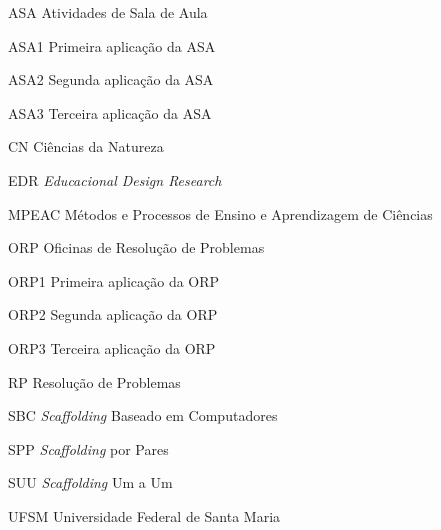 \begin{siglas}
    \item[ASA] Atividades de Sala de Aula 
    \item[ASA1] Primeira aplicação da ASA 
    \item[ASA2] Segunda aplicação da ASA 
    \item[ASA3] Terceira aplicação da ASA 
    \item[CN] Ciências da Natureza
    \item[EDR] \textit{Educacional Design Research}
    \item[MPEAC] Métodos e Processos de Ensino e Aprendizagem de Ciências
    \item[ORP] Oficinas de Resolução de Problemas
    \item[ORP1] Primeira aplicação da ORP
    \item[ORP2] Segunda aplicação da ORP
    \item[ORP3] Terceira aplicação da ORP
    \item[RP] Resolução de Problemas
    \item[SBC] \textit{Scaffolding} Baseado em Computadores
    \item[SPP] \textit{Scaffolding} por Pares
    \item[SUU] \textit{Scaffolding} Um a Um
    \item[UFSM] Universidade Federal de Santa Maria
 
\end{siglas}